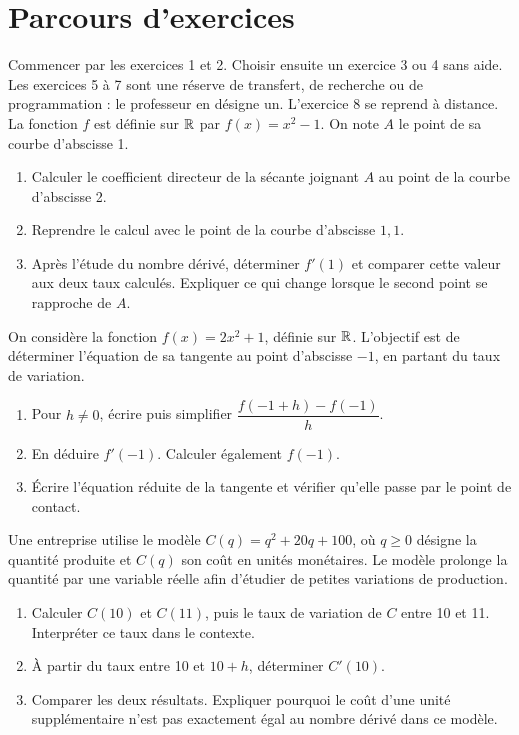 \section*{Parcours d’exercices}\label{C04-PARC}
Commencer par les exercices 1 et 2. Choisir ensuite un exercice 3 ou 4 sans aide. Les exercices 5 à 7 sont une réserve de transfert, de recherche ou de programmation : le professeur en désigne un. L’exercice 8 se reprend à distance.
\begingroup
{}
La fonction $f$ est définie sur $\mathbb R$ par $f(x)=x^2-1$. On note $A$ le point de sa courbe d’abscisse 1.
\begin{enumerate}[label=\arabic*.]
\item Calculer le coefficient directeur de la sécante joignant $A$ au point de la courbe d’abscisse 2.
\item Reprendre le calcul avec le point de la courbe d’abscisse $1{,}1$.
\item Après l’étude du nombre dérivé, déterminer $f\prime(1)$ et comparer cette valeur aux deux taux calculés. Expliquer ce qui change lorsque le second point se rapproche de $A$.
\end{enumerate}
On considère la fonction $f(x)=2x^2+1$, définie sur $\mathbb R$. L’objectif est de déterminer l’équation de sa tangente au point d’abscisse $-1$, en partant du taux de variation.
\begin{enumerate}[label=\arabic*.]
\item Pour $h\ne0$, écrire puis simplifier $\dfrac{f(-1+h)-f(-1)}{h}$.
\item En déduire $f\prime(-1)$. Calculer également $f(-1)$.
\item Écrire l’équation réduite de la tangente et vérifier qu’elle passe par le point de contact.
\end{enumerate}
Une entreprise utilise le modèle $C(q)=q^2+20q+100$, où $q\geq0$ désigne la quantité produite et $C(q)$ son coût en unités monétaires. Le modèle prolonge la quantité par une variable réelle afin d’étudier de petites variations de production.
\begin{enumerate}[label=\arabic*.]
\item Calculer $C(10)$ et $C(11)$, puis le taux de variation de $C$ entre 10 et 11. Interpréter ce taux dans le contexte.
\item À partir du taux entre 10 et $10+h$, déterminer $C\prime(10)$.
\item Comparer les deux résultats. Expliquer pourquoi le coût d’une unité supplémentaire n’est pas exactement égal au nombre dérivé dans ce modèle.
\end{enumerate}

